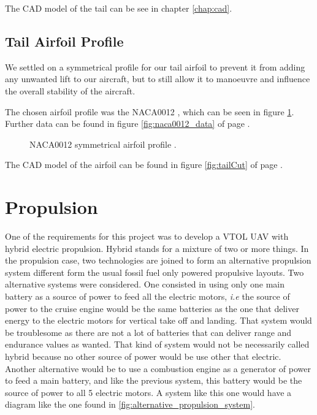 \documentclass[english,fira]{ist-report}
\begin{document}
The CAD model of the tail can be see in chapter \ref{chap:cad}.

\section{Tail Airfoil Profile}

We settled on a symmetrical profile for our tail airfoil to prevent it from adding any unwanted lift to our aircraft, but to still allow it to manoeuvre and influence the overall stability of the aircraft.

The chosen airfoil profile was the NACA0012 \cite{naca0012}, which can be seen in figure \ref{fig:naca0012_profile}. Further data can be found in figure \ref{fig:naca0012_data} of page \pageref{fig:naca0012_data}.
\begin{figure}[ht]
    \centering
    \caption{NACA0012 symmetrical airfoil profile \cite{naca0012}.}
    \label{fig:naca0012_profile}
\end{figure}

The CAD model of the airfoil can be found in figure \ref{fig:tailCut} of page \pageref{fig:tailCut}.

\chapter{Propulsion} \label{chap:prop}


 One of the requirements for this project was to develop a VTOL UAV with hybrid electric propulsion. Hybrid stands for a mixture of two or more things. In the propulsion case, two technologies are joined to form an alternative propulsion system different form the usual fossil fuel only powered propulsive layouts. Two alternative systems were considered. One consisted in using only one main battery as a source of power to feed all the electric motors, \textit{i.e} the source of power to the cruise engine would be the same batteries as the one that deliver energy to the electric motors for vertical take off and landing. That system would be troublesome as there are not a lot of batteries that can deliver range and endurance values as wanted. That kind of system would not be necessarily called hybrid because no other source of power would be use other that electric. Another alternative would be to use a combustion engine as a generator of power to feed a main battery, and like the previous system, this battery would be the source of power to all 5 electric motors. A system like this one would have a diagram like the one found in \ref{fig:alternative_propulsion_system}. 
 
\end{document}

